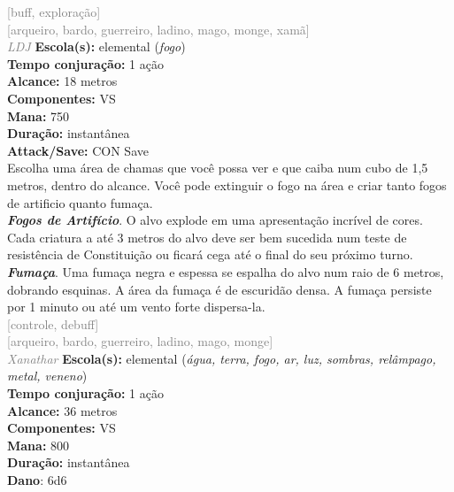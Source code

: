 \documentclass{RPG_Adventure}[2021/10/20]
\begin{document}
{\scriptsize \textcolor{gray}{[buff, exploração]\\}}
{\scriptsize \textcolor{gray}{[arqueiro, bardo, guerreiro, ladino, mago, monge, xamã]\\}}
{\tiny \textcolor{gray}{\textit{LDJ}}}\jump{}
{\small \t \textbf{Escola(s):} elemental (\textit{fogo})\\\t \textbf{Tempo conjuração:} 1 ação\\\t \textbf{Alcance:} 18 metros\\\t \textbf{Componentes:} VS\\\t \textbf{Mana:} 750\\\t \textbf{Duração:} instantânea\\\t \textbf{Attack/Save:} CON Save\\}
{\normalsize Escolha uma área de chamas que você possa ver e que caiba num cubo de 1,5 metros, dentro do alcance. Você pode extinguir o fogo na área e criar tanto fogos de artificio quanto fumaça.\\\t \textbf{\textit{Fogos de Artifício}}. O alvo explode em uma apresentação incrível de cores. Cada criatura a até 3 metros do alvo deve ser bem sucedida num teste de resistência de Constituição ou ficará cega até o final do seu próximo turno.\\\t \textbf{\textit{Fumaça}}. Uma fumaça negra e espessa se espalha do alvo num raio de 6 metros, dobrando esquinas. A área da fumaça é de escuridão densa.  A fumaça persiste por 1 minuto ou até um vento forte dispersa-la.\\}
{\scriptsize \textcolor{gray}{[controle, debuff]\\}}
{\scriptsize \textcolor{gray}{[arqueiro, bardo, guerreiro, ladino, mago, monge]\\}}
{\tiny \textcolor{gray}{\textit{Xanathar}}}\jump{}
{\small \t \textbf{Escola(s):} elemental (\textit{água, terra, fogo, ar, luz, sombras, relâmpago, metal, veneno})\\\t \textbf{Tempo conjuração:} 1 ação\\\t \textbf{Alcance:} 36 metros\\\t \textbf{Componentes:} VS\\\t \textbf{Mana:} 800\\\t \textbf{Duração:} instantânea\\\t \textbf{Dano}: 6d6\\}
\end{document}

